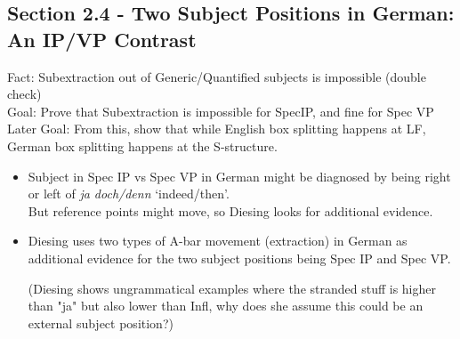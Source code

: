 \documentclass[landscape]{article}
\begin{document}
\subsection*{Section 2.4 - Two Subject Positions in German: An IP/VP Contrast }
Fact: Subextraction out of Generic/Quantified subjects is impossible (double check)\\
Goal: Prove that Subextraction is impossible for SpecIP, and fine for Spec VP\\
Later Goal: From this, show that while English box splitting happens at LF, German box splitting happens at the S-structure.
\begin{itemize}
\item Subject in Spec IP vs Spec VP in German might be diagnosed by being right or left of \textit{ja doch/denn} `indeed/then'. \\
 But reference points might move, so Diesing looks for additional evidence.


\item Diesing uses two types of A-bar movement (extraction) in German as additional evidence for the two subject positions being Spec IP and Spec VP. 


(Diesing shows ungrammatical examples where the stranded stuff is higher than "ja" but also lower than Infl, why does she assume this could be an external subject position?)


\end{itemize}
\end{document}
